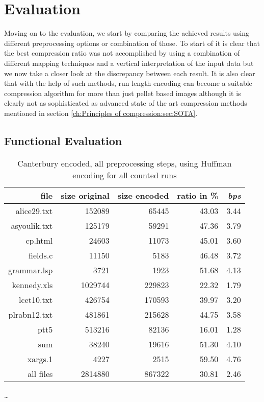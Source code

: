 
\chapter{Evaluation}
\label{ch:Evaluation}
Moving on to the evaluation, we start by comparing the achieved results using different preprocessing options or combination of those. To start of it is clear that the best compression ratio was not accomplished by using a combination of different mapping techniques and a vertical interpretation of the input data but we now take a closer look at the discrepancy between each result. It is also clear that with the help of such methods, run length encoding can become a suitable compression algorithm for more than just pellet based images although it is clearly not as sophisticated as advanced state of the art compression methods mentioned in section \ref{ch:Principles of compression:sec:SOTA}.

\section{Functional Evaluation}
\label{ch:Evaluation:sec:Functional Evaluation}
	\begin{table}[h]
	\centering
	\begin{tabular}{r|r|r|r|r}	
		file & size original & size encoded & ratio in \% & \textit{bps}\\
		\hline
alice29.txt & 152089 & 65445 & 43.03 & 3.44 \\
asyoulik.txt & 125179 & 59291 & 47.36 & 3.79 \\
cp.html & 24603 & 11073 & 45.01 & 3.60 \\
fields.c & 11150 & 5183 & 46.48 & 3.72 \\
grammar.lsp & 3721 & 1923 & 51.68 & 4.13 \\
kennedy.xls & 1029744 & 229823 & 22.32 & 1.79 \\
lcet10.txt & 426754 & 170593 & 39.97 & 3.20 \\
plrabn12.txt & 481861 & 215628 & 44.75 & 3.58 \\
ptt5 & 513216 & 82136 & 16.01 & 1.28 \\
sum & 38240 & 19616 & 51.30 & 4.10 \\
xargs.1 & 4227 & 2515 & 59.50 & 4.76 \\
		\hline
		all files & 2814880 & 867322 & 30.81 & 2.46
	\end{tabular}
	\caption{Canterbury encoded, all preprocessing steps, using Huffman encoding for all counted runs}
	\label{tab:t100:Canterbury encoded, all preprocessing steps, using Huffman encoding for all counted runs}
\end{table}
\ldots

